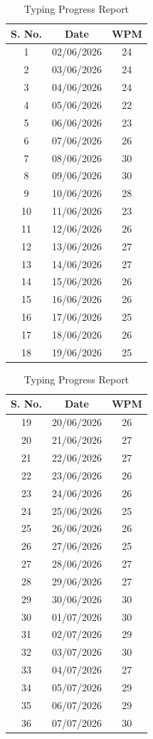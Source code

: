 \documentclass[12pt,a4paper]{report}
\begin{document}
\begin{table}[H]
\centering
\caption{Typing Progress Report}

\begin{minipage}{0.48\textwidth}
\centering
\footnotesize
\begin{tabular}{|c|c|c|}
\hline
\textbf{S. No.} & \textbf{Date} & \textbf{WPM} \\
\hline
1 & 02/06/2026 & 24\\
2 & 03/06/2026 & 24\\
3 & 04/06/2026 & 24\\
4 & 05/06/2026 & 22\\
5 & 06/06/2026 & 23\\
6 & 07/06/2026 & 26\\
7 & 08/06/2026 & 30\\
8 & 09/06/2026 & 30\\
9 & 10/06/2026 & 28\\
10 & 11/06/2026 & 23\\
11 & 12/06/2026 & 26\\
12 & 13/06/2026 & 27\\
13 & 14/06/2026 & 27\\
14 & 15/06/2026 & 26\\
15 & 16/06/2026 & 26\\
16 & 17/06/2026 & 25\\
17 & 18/06/2026 & 26\\
18 & 19/06/2026 & 25\\
\hline
\end{tabular}
\end{minipage}
\hfill
\begin{minipage}{0.48\textwidth}
\centering
\footnotesize
\begin{tabular}{|c|c|c|}
\hline
\textbf{S. No.} & \textbf{Date} & \textbf{WPM} \\
\hline
19 & 20/06/2026 & 26\\
20 & 21/06/2026 & 27\\
21 & 22/06/2026 & 27\\
22 & 23/06/2026 & 26\\
23 & 24/06/2026 & 26\\
24 & 25/06/2026 & 25\\
25 & 26/06/2026 & 26\\
26 & 27/06/2026 & 25\\
27 & 28/06/2026 & 27\\
28 & 29/06/2026 & 27\\
29 & 30/06/2026 & 30\\
30 & 01/07/2026 & 30\\
31 & 02/07/2026 & 29\\
32 & 03/07/2026 & 30\\
33 & 04/07/2026 & 27\\
34 & 05/07/2026 & 29\\
35 & 06/07/2026 & 29\\
36 & 07/07/2026 & 30\\
\hline
\end{tabular}
\end{minipage}

\end{table}
\end{document}

